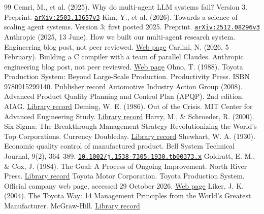 \documentclass[11pt]{article}
\begin{document}
\begin{thebibliography}{99}
 Cemri, M., et al. (2025). Why do multi-agent LLM systems fail? Version 3. Preprint. \href{https://arxiv.org/abs/2503.13657v3}{\nolinkurl{arXiv:2503.13657v3}}
 Kim, Y., et al. (2026). Towards a science of scaling agent systems. Version 3; first posted 2025. Preprint. \href{https://arxiv.org/abs/2512.08296v3}{\nolinkurl{arXiv:2512.08296v3}}
 Anthropic (2025, 13 June). How we built our multi-agent research system. Engineering blog post, not peer reviewed. \href{https://www.anthropic.com/engineering/multi-agent-research-system}{Web page}
 Carlini, N. (2026, 5 February). Building a C compiler with a team of parallel Claudes. Anthropic engineering blog post, not peer reviewed. \href{https://www.anthropic.com/engineering/building-c-compiler}{Web page}
 Ohno, T. (1988). Toyota Production System: Beyond Large-Scale Production. Productivity Press. ISBN 9780915299140. \href{https://www.routledge.com/Toyota-Production-System-Beyond-Large-Scale-Production/Ohno/p/book/9780915299140}{Publisher record}
 Automotive Industry Action Group (2008). Advanced Product Quality Planning and Control Plan (APQP). 2nd edition. AIAG. \href{https://search.worldcat.org/search?q=Advanced+Product+Quality+Planning+and+Control+Plan+AIAG}{Library record}
 Deming, W. E. (1986). Out of the Crisis. MIT Center for Advanced Engineering Study. \href{https://search.worldcat.org/search?q=Deming+Out+of+the+Crisis+1986}{Library record}
 Harry, M., \& Schroeder, R. (2000). Six Sigma: The Breakthrough Management Strategy Revolutionizing the World's Top Corporations. Currency Doubleday. \href{https://search.worldcat.org/search?q=Harry+Schroeder+Six+Sigma+Breakthrough+Management+Strategy}{Library record}
 Shewhart, W. A. (1930). Economic quality control of manufactured product. Bell System Technical Journal, 9(2), 364--389. \href{https://doi.org/10.1002/j.1538-7305.1930.tb00373.x}{\nolinkurl{10.1002/j.1538-7305.1930.tb00373.x}}
 Goldratt, E. M., \& Cox, J. (1984). The Goal: A Process of Ongoing Improvement. North River Press. \href{https://search.worldcat.org/search?q=Goldratt+Cox+The+Goal+1984}{Library record}
 Toyota Motor Corporation. Toyota Production System. Official company web page, accessed 29 October 2026. \href{https://global.toyota/en/company/vision-and-philosophy/production-system/index.html}{Web page}
 Liker, J. K. (2004). The Toyota Way: 14 Management Principles from the World's Greatest Manufacturer. McGraw-Hill. \href{https://search.worldcat.org/search?q=Liker+The+Toyota+Way+2004}{Library record}

\end{thebibliography}
\end{document}
